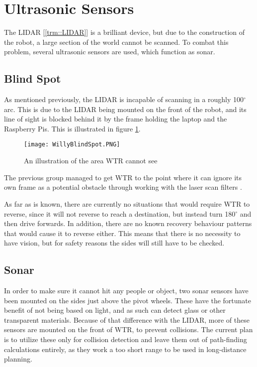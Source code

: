 \section{Ultrasonic Sensors}
The LIDAR [\ref{trm::LIDAR}] is a brilliant device, but due to the construction of the robot, a large section of the world cannot be scanned.
To combat this problem, several ultrasonic sensors are used, which function as sonar.

\subsection{Blind Spot}
As mentioned previously, the LIDAR is incapable of scanning in a roughly 100$^\circ$ arc.
This is due to the LIDAR being mounted on the front of the robot, and its line of sight is blocked behind it by the frame holding the laptop and the Raspberry Pis.
This is illustrated in figure \ref{fig::blindspot}.

\begin{figure}[H]
\centering
\texttt{[image: WillyBlindSpot.PNG]}
\caption{An illustration of the area WTR cannot see}
\label{fig::blindspot}
\end{figure}

The previous group managed to get WTR to the point where it can ignore its own frame as a potential obstacle through working with the laser scan filters \cite{laserscan}.

As far as is known, there are currently no situations that would require WTR to reverse, since it will not reverse to reach a destination, but instead turn 180$^{\circ}$ and then drive forwards.
In addition, there are no known recovery behaviour patterns that would cause it to reverse either.
This means that there is no necessity to have vision, but for safety reasons the sides will still have to be checked.


\subsection{Sonar}
In order to make sure it cannot hit any people or object, two sonar sensors have been mounted on the sides just above the pivot wheels.
These have the fortunate benefit of not being based on light, and as such can detect glass or other transparent materials.
Because of that difference with the LIDAR, more of these sensors are mounted on the front of WTR, to prevent collisions.
The current plan is to utilize these only for collision detection and leave them out of path-finding calculations entirely, as they work a too short range to be used in long-distance planning.

